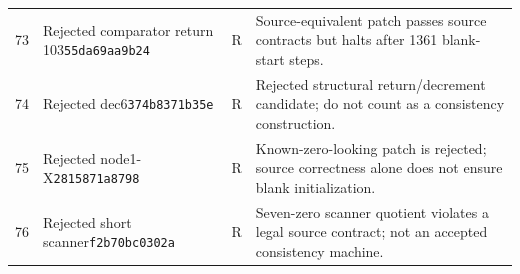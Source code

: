\begin{longtable}{@{}rp{}cp{}@{}}
73 & Rejected comparator return 103\newline\texttt{55da69aa9b24} & R & Source-equivalent patch passes source contracts but halts after 1361 blank-start steps.\\[5pt]
74 & Rejected dec6\newline\texttt{374b8371b35e} & R & Rejected structural return/decrement candidate; do not count as a consistency construction.\\[5pt]
75 & Rejected node1-X\newline\texttt{2815871a8798} & R & Known-zero-looking patch is rejected; source correctness alone does not ensure blank initialization.\\[5pt]
76 & Rejected short scanner\newline\texttt{f2b70bc0302a} & R & Seven-zero scanner quotient violates a legal source contract; not an accepted consistency machine.\\[5pt]
\bottomrule\end{longtable}\endgroup
